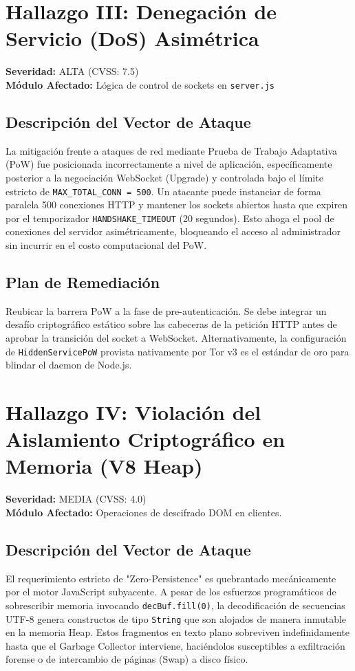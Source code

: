 \documentclass[12pt, a4paper]{article}
\begin{document}
\section{Hallazgo III: Denegación de Servicio (DoS) Asimétrica}
\textbf{Severidad:} ALTA (CVSS: 7.5)\\
\textbf{Módulo Afectado:} Lógica de control de sockets en \texttt{server.js}

\subsection{Descripción del Vector de Ataque}
La mitigación frente a ataques de red mediante Prueba de Trabajo Adaptativa (PoW) fue posicionada incorrectamente a nivel de aplicación, específicamente posterior a la negociación WebSocket (Upgrade) y controlada bajo el límite estricto de \texttt{MAX\_TOTAL\_CONN = 500}. Un atacante puede instanciar de forma paralela 500 conexiones HTTP y mantener los sockets abiertos hasta que expiren por el temporizador \texttt{HANDSHAKE\_TIMEOUT} (20 segundos). Esto ahoga el pool de conexiones del servidor asimétricamente, bloqueando el acceso al administrador sin incurrir en el costo computacional del PoW.

\subsection{Plan de Remediación}
Reubicar la barrera PoW a la fase de pre-autenticación. Se debe integrar un desafío criptográfico estático sobre las cabeceras de la petición HTTP antes de aprobar la transición del socket a WebSocket. Alternativamente, la configuración de \texttt{HiddenServicePoW} provista nativamente por Tor v3 es el estándar de oro para blindar el daemon de Node.js.

\section{Hallazgo IV: Violación del Aislamiento Criptográfico en Memoria (V8 Heap)}
\textbf{Severidad:} MEDIA (CVSS: 4.0)\\
\textbf{Módulo Afectado:} Operaciones de descifrado DOM en clientes.

\subsection{Descripción del Vector de Ataque}
El requerimiento estricto de "Zero-Persistence" es quebrantado mecánicamente por el motor JavaScript subyacente. A pesar de los esfuerzos programáticos de sobrescribir memoria invocando \texttt{decBuf.fill(0)}, la decodificación de secuencias UTF-8 genera constructos de tipo \texttt{String} que son alojados de manera inmutable en la memoria Heap. Estos fragmentos en texto plano sobreviven indefinidamente hasta que el Garbage Collector interviene, haciéndolos susceptibles a exfiltración forense o de intercambio de páginas (Swap) a disco físico.
\end{document}
